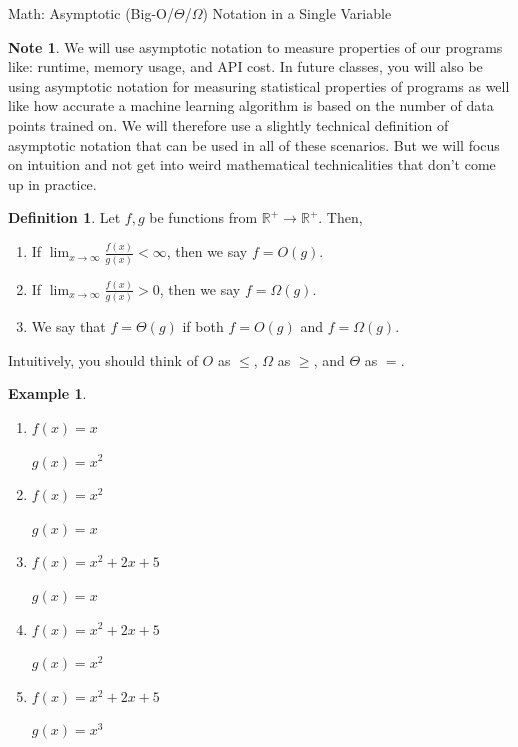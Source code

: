 \documentclass[10pt]{article}
\theoremstyle{definition}
\newtheorem{example}[problem]{Example}
\newtheorem{note}[problem]{Note}
\newtheorem{defn}[problem]{Definition}
\newcommand{\R}{\mathbb R}
\begin{document}
\begin{center}
    {
\Large
    Math: Asymptotic (Big-O/$\Theta$/$\Omega$) Notation in a Single Variable
}
\end{center}
\begin{note}
    We will use asymptotic notation to measure properties of our programs like: runtime, memory usage, and API cost.
    In future classes, you will also be using asymptotic notation for measuring statistical properties of programs as well like how accurate a machine learning algorithm is based on the number of data points trained on.
    We will therefore use a slightly technical definition of asymptotic notation that can be used in all of these scenarios.
    But we will focus on intuition and not get into weird mathematical technicalities that don't come up in practice.
\end{note}

\begin{defn}
    Let $f,g$ be functions from $\R^+\to\R^+$.
    Then,
    \begin{enumerate}
        \item If $\displaystyle\lim_{x\to\infty} \frac{f(x)}{g(x)} < \infty$, then we say $f = O(g)$.
        \item If $\displaystyle\lim_{x\to\infty} \frac{f(x)}{g(x)} > 0$, then we say $f = \Omega(g)$.
        \item We say that $f = \Theta(g)$ if both $f=O(g)$ and $f=\Omega(g)$.
    \end{enumerate}
    Intuitively, you should think of $O$ as $\le$, $\Omega$ as $\ge$, and $\Theta$ as $=$.
\end{defn}

\begin{example}~
    \begin{enumerate}
        \item 
            $f(x) = x$
            
            $g(x) = x^2$
            \vspace{0.6in}
        \item
            $f(x) = x^2$
            
            $g(x) = x$
            \vspace{0.6in}
        \item
            $f(x) = x^2 + 2x + 5$
            
            $g(x) = x$
            \vspace{0.6in}
        \item
            $f(x) = x^2 + 2x + 5$
            
            $g(x) = x^2$
            \vspace{0.6in}
        \item
            $f(x) = x^2 + 2x + 5$
            
            $g(x) = x^3$
    \end{enumerate}
\end{example}
\end{document}
